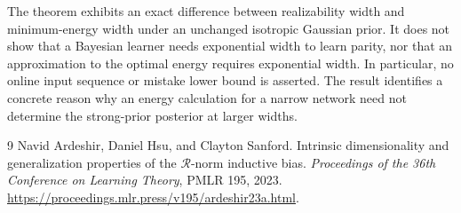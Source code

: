 \documentclass[11pt]{article}
\begin{document}
The theorem exhibits an exact difference between realizability width
and minimum-energy width under an unchanged isotropic Gaussian prior.
It does not show that a Bayesian learner needs exponential width to
learn parity, nor that an approximation to the optimal energy requires
exponential width. In particular, no online input sequence or mistake
lower bound is asserted. The result identifies a concrete reason why
an energy calculation for a narrow network need not determine the
strong-prior posterior at larger widths.

\begin{thebibliography}{9}
Navid Ardeshir, Daniel Hsu, and Clayton Sanford.
Intrinsic dimensionality and generalization properties of the
$\mathcal R$-norm inductive bias.
\emph{Proceedings of the 36th Conference on Learning Theory},
PMLR 195, 2023.
\url{https://proceedings.mlr.press/v195/ardeshir23a.html}.
\end{thebibliography}
\end{document}
